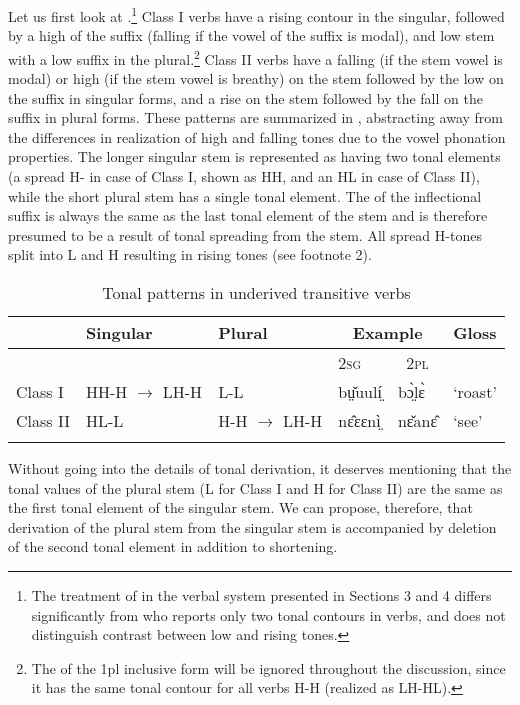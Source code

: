 \documentclass[output=paper,newtxmath,modfonts,nonflat]{langsci/langscibook}
\begin{document}
Let us first look at .\footnote{The treatment of  in the verbal system presented in Sections 3 and 4 differs significantly from \citet{gjersøe2017} who reports only two tonal contours in verbs, and does not distinguish contrast between low and rising tones.} Class I verbs have a rising contour in the singular, followed by a high  of the suffix (falling if the vowel of the suffix is modal), and low stem with a low suffix in the plural.\footnote{The  of the 1pl inclusive form will be ignored throughout the discussion, since it has the same tonal contour for all verbs H-H (realized as LH-HL).} Class II verbs have a falling  (if the stem vowel is modal) or high (if the stem vowel is breathy)  on the stem followed by the low  on the suffix in singular forms, and a rise on the stem followed by the fall on the suffix in plural forms. These patterns are summarized in , abstracting away from the differences in realization of high and falling tones due to the vowel phonation properties. The longer singular stem is represented as having two tonal elements (a spread H- in case of Class I, shown as HH, and an HL in case of Class II), while the short plural stem has a single tonal element. The  of the inflectional suffix is always the same as the last tonal element of the stem and is therefore presumed to be a result of tonal spreading from the stem. All spread H-tones split into L and H resulting in rising tones (see footnote 2). 



\begin{table}
\begin{tabularx}{\textwidth}{lllXXX}
\lsptoprule
 & Singular & Plural & \multicolumn{2}{c}{Example} & Gloss\\
\midrule
&  &  & \scshape 2sg & \multicolumn{1}{c}{\scshape 2pl} & \\
Class I & HH-H $\rightarrow$ LH-H & L-L & bṳ̌uulí̤ & bɔ̤̀lɛ̀ & ‘roast’\\
Class II & HL-L & H-H $\rightarrow$ LH-H & nɛ̂ɛɛnì̤ & nɛ̌anɛ̂ & ‘see’\\
\lspbottomrule
\end{tabularx}
\caption{Tonal patterns in underived transitive verbs}
\label{tab:monich:7}
\end{table}

Without going into the details of tonal derivation, it deserves mentioning that the tonal values of the plural stem (L for Class I and H for Class II) are the same as the first tonal element of the singular stem. We can propose, therefore, that derivation of the plural stem from the singular stem is accompanied by deletion of the second tonal element in addition to shortening.
\end{document}

